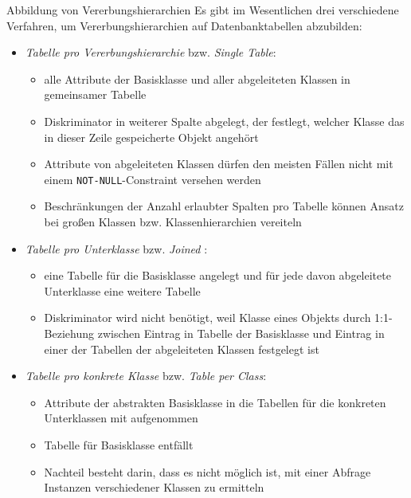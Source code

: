 \begin{defi}{Abbildung von Vererbungshierarchien}
    Es gibt im Wesentlichen drei verschiedene Verfahren, um Vererbungshierarchien auf Datenbanktabellen abzubilden:
    \begin{itemize}
        \item \emph{Tabelle pro Vererbungshierarchie} bzw. \emph{Single Table}:
              \begin{itemize}
                  \item alle Attribute der Basisklasse und aller abgeleiteten Klassen in gemeinsamer Tabelle
                  \item Diskriminator in weiterer Spalte abgelegt, der festlegt, welcher Klasse das in dieser Zeile gespeicherte Objekt angehört
                  \item Attribute von abgeleiteten Klassen dürfen den meisten Fällen nicht mit einem \texttt{NOT-NULL}-Constraint versehen werden
                  \item Beschränkungen der Anzahl erlaubter Spalten pro Tabelle können Ansatz bei großen Klassen bzw. Klassenhierarchien vereiteln
              \end{itemize}
        \item \emph{Tabelle pro Unterklasse} bzw. \emph{Joined }:
              \begin{itemize}
                  \item eine Tabelle für die Basisklasse angelegt und für jede davon abgeleitete Unterklasse eine weitere Tabelle
                  \item Diskriminator wird nicht benötigt, weil Klasse eines Objekts durch 1:1-Beziehung zwischen Eintrag in Tabelle der Basisklasse und Eintrag in einer der Tabellen der abgeleiteten Klassen festgelegt ist
              \end{itemize}
        \item \emph{Tabelle pro konkrete Klasse} bzw. \emph{Table per Class}:
              \begin{itemize}
                  \item Attribute der abstrakten Basisklasse in die Tabellen für die konkreten Unterklassen mit aufgenommen
                  \item  Tabelle für Basisklasse entfällt
                  \item  Nachteil besteht darin, dass es nicht möglich ist, mit einer Abfrage Instanzen verschiedener Klassen zu ermitteln
              \end{itemize}
    \end{itemize}

\end{defi}